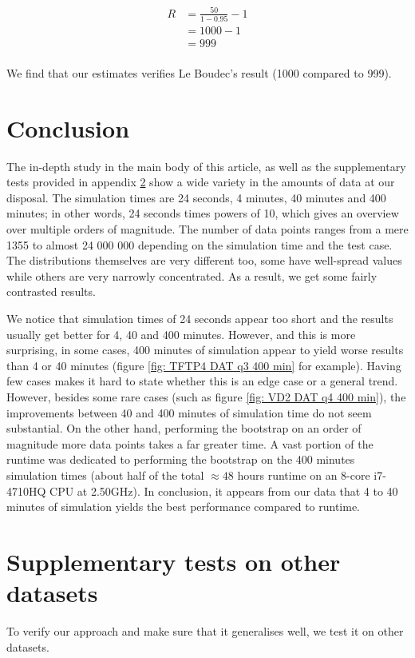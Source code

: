 \documentclass{article}
\begin{document}
\begin{align*}
    R & = \frac{50}{1 - 0.95} - 1 \\
      & = 1000 - 1                \\
      & = 999                     \\
\end{align*}

We find that our estimates verifies Le Boudec's result (1000 compared to 999).


\section{Conclusion}

The in-depth study in the main body of this article, as well as the supplementary tests provided in appendix \ref{app: supplementary tests on other datasets} show a wide variety in the amounts of data at our disposal. The simulation times are 24 seconds, 4 minutes, 40 minutes and 400 minutes; in other words, 24 seconds times powers of 10, which gives an overview over multiple orders of magnitude. The number of data points ranges from a mere 1355 to almost 24 000 000 depending on the simulation time and the test case. The distributions themselves are very different too, some have well-spread values while others are very narrowly concentrated. As a result, we get some fairly contrasted results.

We notice that simulation times of 24 seconds appear too short and the results usually get better for 4, 40 and 400 minutes. However, and this is more surprising, in some cases, 400 minutes of simulation appear to yield worse results than 4 or 40 minutes (figure \ref{fig: TFTP4 DAT q3 400 min} for example). Having few cases makes it hard to state whether this is an edge case or a general trend. However, besides some rare cases (such as figure \ref{fig: VD2 DAT q4 400 min}), the improvements between 40 and 400 minutes of simulation time do not seem substantial. On the other hand, performing the bootstrap on an order of magnitude more data points takes a far greater time. A vast portion of the runtime was dedicated to performing the bootstrap on the 400 minutes simulation times (about half of the total $\approx 48$ hours runtime on an 8-core i7-4710HQ CPU at 2.50GHz). In conclusion, it appears from our data that 4 to 40 minutes of simulation yields the best performance compared to runtime.


\newpage
\appendix
\section{Supplementary tests on other datasets}
\label{app: supplementary tests on other datasets}
To verify our approach and make sure that it generalises well, we test it on other datasets.
\end{document}
